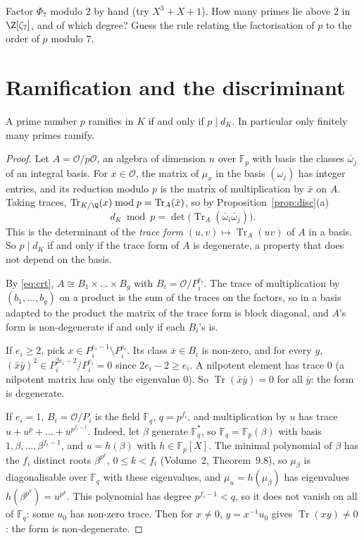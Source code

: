 \begin{think}
Factor $\Phi_7$ modulo $2$ by hand (try $X^3+X+1$). How many primes lie above $2$ in $\Z[\zeta_7]$, and of which degree?
Guess the rule relating the factorisation of $p$ to the order of $p$ modulo $7$.
\end{think}

\section{Ramification and the discriminant}

\begin{theorem}\label{thm:ramdisc}
A prime number $p$ ramifies in $K$ if and only if $p\mid d_K$. In particular only finitely many primes ramify.
\end{theorem}
\begin{proof}
Let $A=\mathcal O/p\mathcal O$, an algebra of dimension $n$ over $\mathbb F_p$ with basis the classes $\bar\omega_j$ of an
integral basis. For $x\in\mathcal O$, the matrix of $\mu_x$ in the basis $(\omega_j)$ has integer entries, and its
reduction modulo $p$ is the matrix of multiplication by $\bar x$ on $A$. Taking traces, $\operatorname{Tr}_{K/\Q}(x)\bmod
p=\operatorname{Tr}_A(\bar x)$, so by Proposition~\ref{prop:disc}(a)
\[
d_K\bmod p=\det\bigl(\operatorname{Tr}_A(\bar\omega_i\bar\omega_j)\bigr).
\]
This is the determinant of the \emph{trace form} $(u,v)\mapsto\operatorname{Tr}_A(uv)$ of $A$ in a basis. So $p\mid
d_K$ if and only if the trace form of $A$ is degenerate, a property that does not depend on the basis.

By \eqref{eq:crt}, $A\cong B_1\times\dots\times B_g$ with $B_i=\mathcal O/P_i^{e_i}$. The trace of multiplication by
$(b_1,\dots,b_g)$ on a product is the sum of the traces on the factors, so in a basis adapted to the product the matrix
of the trace form is block diagonal, and $A$'s form is non-degenerate if and only if each $B_i$'s is.

If $e_i\ge2$, pick $x\in P_i^{e_i-1}\setminus P_i^{e_i}$. Its class $\bar x\in B_i$ is non-zero, and for every $y$,
$(\bar x\bar y)^{2}\in P_i^{2e_i-2}/P_i^{e_i}=0$ since $2e_i-2\ge e_i$. A nilpotent element has trace $0$ (a nilpotent
matrix has only the eigenvalue $0$). So $\operatorname{Tr}(\bar x\bar y)=0$ for all $\bar y$: the form is degenerate.

If $e_i=1$, $B_i=\mathcal O/P_i$ is the field $\mathbb F_{q}$, $q=p^{f_i}$, and multiplication by $u$ has trace
$u+u^p+\dots+u^{p^{f_i-1}}$. Indeed, let $\beta$ generate $\mathbb F_q^*$, so $\mathbb F_q=\mathbb F_p(\beta)$ with basis
$1,\beta,\dots,\beta^{f_i-1}$, and $u=h(\beta)$ with $h\in\mathbb F_p[X]$. The minimal polynomial of $\beta$ has the $f_i$
distinct roots $\beta^{p^k}$, $0\le k<f_i$ (Volume~2, Theorem~9.8), so $\mu_\beta$ is diagonalisable over $\mathbb F_q$ with
these eigenvalues, and $\mu_u=h(\mu_\beta)$ has eigenvalues $h(\beta^{p^k})=u^{p^k}$. This polynomial has degree $p^{f_i-1}<q$, so it does not vanish on all of
$\mathbb F_q$: some $u_0$ has non-zero trace. Then for $x\ne0$, $y=x^{-1}u_0$ gives $\operatorname{Tr}(xy)\ne0$: the form is
non-degenerate.


\end{proof}
